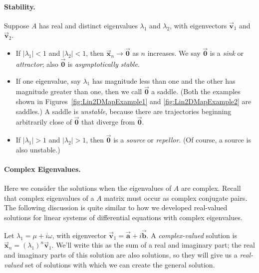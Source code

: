 \documentclass[reqno]{immbook}
\newcommand{\BA}{\vec{\textbf{a}}}
\newcommand{\BB}{\vec{\textbf{b}}}
\newcommand{\BV}{\vec{\textbf{v}}}
\newcommand{\BX}{\vec{\textbf{x}}}
\newcommand{\BZ}{\vec{\textbf{0}}}  %
\begin{document}
\paragraph{Stability.}
Suppose $A$ has real and distinct eigenvalues
$\lambda_1$ and $\lambda_2$, with eigenvectors
$\BV_1$ and $\BV_2$.
\begin{itemize}
\item If $|\lambda_1|<1$ and $|\lambda_2|<1$, then
$\BX_n\rightarrow\BZ$ as $n$ increases.  We say
$\BZ$ is a \emph{sink} or \emph{attractor}; also
$\BZ$ is \emph{asymptotically stable}.
\item If one eigenvalue, say $\lambda_1$ has magnitude less than
one and the other has magnitude greater than one, then
we call $\BZ$ a saddle.  (Both the examples shown in
Figures~\ref{fig:Lin2DMapExample1} and \ref{fig:Lin2DMapExample2}
are saddles.) A saddle is \emph{unstable}, because there
are trajectories beginning arbitrarily close of $\BZ$ that
diverge from $\BZ$.
\item If $|\lambda_1|>1$ and $|\lambda_2|>1$, then
$\BZ$ is a \emph{source} or \emph{repellor}.  (Of course,
a source is also unstable.)
\end{itemize}
%
%
\paragraph{Complex Eigenvalues.}
Here we consider the solutions when the eigenvalues of
$A$ are complex.  Recall that complex eigenvalues of a $A$
matrix must occur as complex conjugate pairs.
The following discussion is quite similar to how
we developed real-valued solutions for linear systems
of differential equations with complex eigenvalues.
 
Let $\lambda_1=\mu + i\omega$,
with eigenvector $\BV_1 = \BA + i \BB$.
A \emph{complex-valued} solution is
$\BX_n = (\lambda_1)^n\BV_1$.
We'll write this as the sum of a real and imaginary part;
the real and imaginary parts of this solution are also solutions,
so they will give us a \emph{real-valued} set of solutions
with which we can create the general solution.
\end{document}
